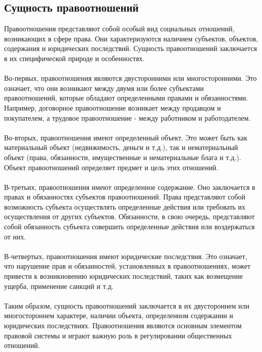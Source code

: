 \documentclass{article}
\begin{document}
\subsection{Сущность правоотношений}
Правоотношения представляют собой особый вид социальных отношений, возникающих в сфере права. Они характеризуются наличием субъектов, объектов, содержания и юридических последствий. Сущность правоотношений заключается в их специфической природе и особенностях.\\
~\\
Во-первых, правоотношения являются двусторонними или многосторонними. Это означает, что они возникают между двумя или более субъектами правоотношений, которые обладают определенными правами и обязанностями. Например, договорное правоотношение возникает между продавцом и покупателем, а трудовое правоотношение - между работником и работодателем.\\
~\\
Во-вторых, правоотношения имеют определенный объект. Это может быть как материальный объект (недвижимость, деньги и т.д.), так и нематериальный объект (права, обязанности, имущественные и нематериальные блага и т.д.). Объект правоотношений определяет предмет и цель этих отношений.\\
~\\
В-третьих, правоотношения имеют определенное содержание. Оно заключается в правах и обязанностях субъектов правоотношений. Права представляют собой возможность субъекта осуществлять определенные действия или требовать их осуществления от других субъектов. Обязанности, в свою очередь, представляют собой обязанность субъекта совершить определенные действия или воздержаться от них.\\
~\\
В-четвертых, правоотношения имеют юридические последствия. Это означает, что нарушение прав и обязанностей, установленных в правоотношениях, может привести к возникновению юридических последствий, таких как возмещение ущерба, применение санкций и т.д.\\
~\\
Таким образом, сущность правоотношений заключается в их двустороннем или многостороннем характере, наличии объекта, определенном содержании и юридических последствиях. Правоотношения являются основным элементом правовой системы и играют важную роль в регулировании общественных отношений.
\end{document}
